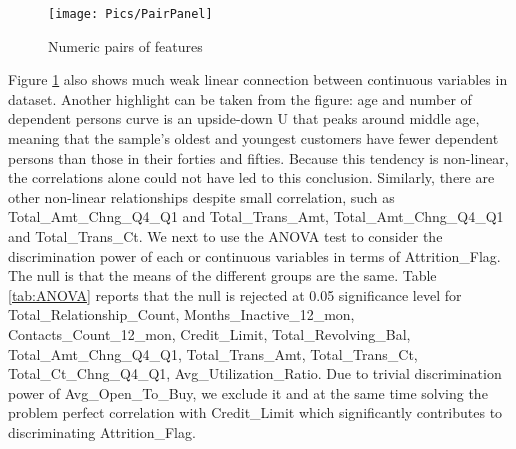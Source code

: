 \begin{Schunk}
\begin{figure}[h]

{\centering \texttt{[image: Pics/PairPanel]} 

}

\caption[Numeric pairs of features]{Numeric pairs of features}\label{fig:pair}
\end{figure}
\end{Schunk}

Figure \ref{fig:pair} also shows much weak linear connection between
continuous variables in dataset. Another highlight can be taken from the
figure: age and number of dependent persons curve is an upside-down U
that peaks around middle age, meaning that the sample's oldest and
youngest customers have fewer dependent persons than those in their
forties and fifties. Because this tendency is non-linear, the
correlations alone could not have led to this conclusion. Similarly,
there are other non-linear relationships despite small correlation, such
as Total\_Amt\_Chng\_Q4\_Q1 and Total\_Trans\_Amt,
Total\_Amt\_Chng\_Q4\_Q1 and Total\_Trans\_Ct. We next to use the ANOVA
test to consider the discrimination power of each or continuous
variables in terms of Attrition\_Flag. The null is that the means of the
different groups are the same. Table \ref{tab:ANOVA} reports that the
null is rejected at 0.05 significance level for
Total\_Relationship\_Count, Months\_Inactive\_12\_mon,
Contacts\_Count\_12\_mon, Credit\_Limit, Total\_Revolving\_Bal,
Total\_Amt\_Chng\_Q4\_Q1, Total\_Trans\_Amt, Total\_Trans\_Ct,
Total\_Ct\_Chng\_Q4\_Q1, Avg\_Utilization\_Ratio. Due to trivial
discrimination power of Avg\_Open\_To\_Buy, we exclude it and at the
same time solving the problem perfect correlation with Credit\_Limit
which significantly contributes to discriminating Attrition\_Flag.

